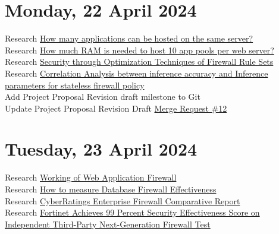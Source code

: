 \section[2024/04/22]{Monday, 22 April 2024}
Research \href{https://www.quora.com/How-many-applications-can-be-hosted-on-the-same-server}{How many applications can be hosted on the same server?}\\
Research \href{https://sharepoint.stackexchange.com/questions/15143/how-much-ram-is-needed-to-host-10-app-pools-per-web-server}{How much RAM is needed to host 10 app pools per web server?}\\
Research \href{https://ieeexplore-ieee-org.uplib.idm.oclc.org/document/9051476/}{Security through Optimization Techniques of Firewall Rule Sets}\\
Research \href{https://ieeexplore-ieee-org.uplib.idm.oclc.org/document/6665274/}{Correlation Analysis between inference accuracy and Inference parameters for stateless firewall policy}\\
Add Project Proposal Revision draft milestone to Git\\
Update Project Proposal Revision Draft \href{https://repo.ee.up.ac.za/eece_ugfyp_tg/2024_isg/tg4-koot-u20426471/-/merge_requests/12}{Merge Request \#12}\\
\pendsign

\section[2024/04/23]{Tuesday, 23 April 2024}
Research \href{https://www.researchgate.net/figure/Working-of-web-application-firewall_fig1_368469750#:~:text=The%20first%20detection%20layer%20achieved,89.34%25%20accuracy.%20...&text=Web%20application%20firewalls%20(WAFs)%20are,defense%20against%20various%20cyber%20attacks.}{Working of Web Application Firewall}\\
Research \href{https://www.linkedin.com/advice/1/how-can-you-measure-effectiveness-database-bpyqc}{How to measure Database Firewall Effectiveness}\\
Research \href{https://www.exclusive-networks.com/nl/wp-content/uploads/sites/21/2023/05/CyberRatings_Enterprise-Firewall_Comparative-Report_April2023.pdf}{CyberRatings Enterprise Firewall Comparative Report}\\
Research \href{https://www.fortinet.com/corporate/about-us/newsroom/press-releases/2023/fortinet-achieves-99-percent-security-effectiveness-score-on-independent-third-party-next-generation-firewall-test}{Fortinet Achieves 99 Percent Security Effectiveness Score on Independent Third-Party Next-Generation Firewall Test}\\
\pendsign

